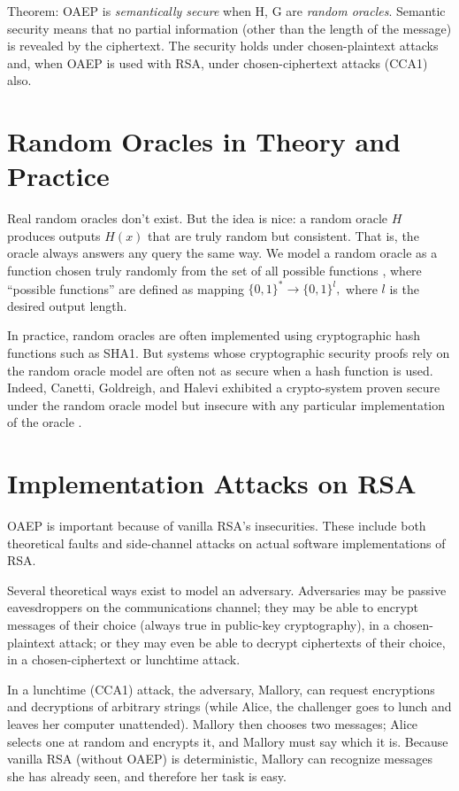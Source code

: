 \documentclass[10pt]{article}
\begin{document}
Theorem: OAEP is \textit{semantically secure} when H, G are \textit{random oracles}. Semantic security means that no partial information (other than the length of the message) is revealed by the ciphertext. The security holds under chosen-plaintext attacks and, when OAEP is used with RSA, under chosen-ciphertext attacks (CCA1) also. 

\section{Random Oracles in Theory and Practice}

Real random oracles don't exist. But the idea is nice: a random oracle $H$ produces outputs $H(x)$ that are truly random but consistent. That is, the oracle always answers any query the same way. We model a random oracle as a function chosen truly randomly from the set of all possible functions \cite{CGH}, where ``possible functions'' are defined as mapping $\{0, 1\}^* \rightarrow \{0,1\}^l,$ where $l$ is the desired output length. 

In practice, random oracles are often implemented using cryptographic hash functions such as SHA1. But systems whose cryptographic security proofs rely on the random oracle model are often not as secure when a hash function is used. Indeed, Canetti, Goldreigh, and Halevi exhibited a crypto-system proven secure under the random oracle model but insecure with any particular implementation of the oracle \cite{CGH}. 

\section{Implementation Attacks on RSA}
OAEP is important because of vanilla RSA's insecurities. These include both theoretical faults and side-channel attacks on actual software implementations of RSA. 

Several theoretical ways exist to model an adversary. Adversaries may be passive eavesdroppers on the communications channel; they may be able to encrypt messages of their choice (always true in public-key cryptography), in a chosen-plaintext attack; or they may even be able to decrypt ciphertexts of their choice, in a chosen-ciphertext or lunchtime attack. 

In a lunchtime (CCA1) attack, the adversary, Mallory, can request encryptions and decryptions of arbitrary strings (while Alice, the challenger goes to lunch and leaves her computer unattended). Mallory then chooses two messages; Alice selects one at random and encrypts it, and Mallory must say which it is. Because vanilla RSA (without OAEP) is deterministic, Mallory can recognize messages she has already seen, and therefore her task is easy. 
\end{document}
